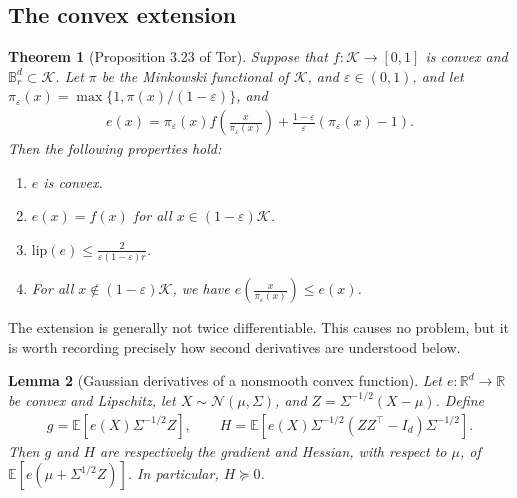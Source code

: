 \documentclass{article}
\theoremstyle{plain}
\newtheorem{theorem}{Theorem}
\newtheorem{lemma}[theorem]{Lemma}
\theoremstyle{definition}
\theoremstyle{plain}
\newcommand{\R}{\mathbb R}
\newcommand{\E}{\mathbb E}
\newcommand{\cN}{\mathcal N}
\newcommand{\cK}{\mathcal K}
\renewcommand{\epsilon}{\varepsilon}
\begin{document}
\subsection{The convex extension}
\begin{theorem}[Proposition 3.23 of Tor]
    Suppose that $f:\cK\to[0,1]$ is convex and $\mathbb{B}_r^d \subset \cK$.
    Let $\pi$ be the Minkowski functional of $\cK$,
    and $\epsilon \in (0, 1)$, and let $\pi_\epsilon(x) = \max\{1, \pi(x)/(1-\epsilon)\}$,
    and
    \begin{align}
        e(x)
        =\pi_\varepsilon(x)
        f\left(\frac{x}{\pi_\varepsilon(x)}\right)
        +\frac{1 - \varepsilon}{\varepsilon}
        \left(\pi_\varepsilon(x)-1\right).
        \label{eq:direct-stoch-extension}
    \end{align}
    Then the following properties hold:
    \begin{enumerate}
        \item $e$ is convex.
        \item $e(x) = f(x)$ for all $x \in (1-\varepsilon)\cK$.
        \item $\text{lip}(e) \leq \frac{2}{\varepsilon(1-\varepsilon)r}$.
        \item For all $x \notin (1-\varepsilon)\cK$, we have $e\left(\frac{x}{\pi_\varepsilon(x)}\right) \leq e(x)$.
    \end{enumerate}
\end{theorem}


The extension is generally not twice differentiable.  This causes no
problem, but it is worth recording precisely how second derivatives are
understood below.

\begin{lemma}[Gaussian derivatives of a nonsmooth convex function]
    \label{lem:direct-stoch-nonsmooth}
    Let $e:\R^d\to\R$ be convex and Lipschitz, let
    $X\sim\cN(\mu,\Sigma)$, and $Z=\Sigma^{-1/2}(X-\mu)$.  Define
    \begin{align}
        g
        =\E\left[e(X)\Sigma^{-1/2}Z\right],
        \qquad
        H
        =\E\left[e(X)\Sigma^{-1/2}
            (ZZ^\top-I_d)\Sigma^{-1/2}\right].
        \label{eq:direct-stoch-nonsmooth-H}
    \end{align}
    Then $g$ and $H$ are respectively the gradient and Hessian, with
    respect to $\mu$, of $\E[e(\mu+\Sigma^{1/2}Z)]$.  In particular,
    $H\succeq0$.
\end{lemma}
\end{document}

